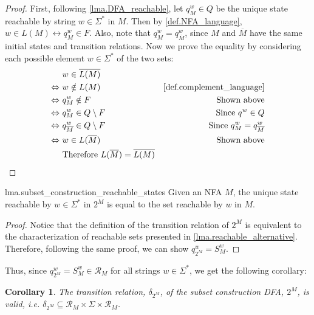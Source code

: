 \documentclass{report}
\newtheorem{corollary}[theorem]{Corollary}
\theoremstyle{definition}
\begin{document}
\begin{appendices}
\begin{proof}
First, following \cref{lma.DFA_reachable}, let $q^w_M \in Q$ be the unique state
reachable by string $w \in \Sigma^{\ast}$ in $M$. Then by
\cref{def.NFA_language}, $w \in L(M) \leftrightarrow q^w_M \in F$.
Also, note that $q^w_M = q^w_{\overline{M}}$, since $M$ and $\overline{M}$ have
the same initial states and transition relations.
Now we prove the equality by considering each possible element $w \in \Sigma^{\ast}$
of the two sets:
\begin{align*}
& w \in \overline{L(M)} \\
\Leftrightarrow \ & w \notin L(M)
& \text{\cref{def.complement_language}} \\
\Leftrightarrow \ & q^w_M \notin F
& \text{Shown above} \\
\Leftrightarrow \ & q^w_M \in Q \setminus F
& \text{Since } q^w \in Q \\
\Leftrightarrow \ & q^w_{\overline{M}} \in Q \setminus F
& \text{Since } q^w_M = q^w_{\overline{M}} \\
\Leftrightarrow \ & w \in L(\overline{M})
& \text{Shown above} \\
& \text{Therefore } L(\overline{M}) = \overline{L(M)}
\end{align*}
\end{proof}

\begin{replemma}{lma.subset_construction_reachable_states}
Given an NFA $M$, the unique state reachable by $w \in \Sigma^{\ast}$ in $2^M$
is equal to the set reachable by $w$ in $M$.
\end{replemma}

\begin{proof}
Notice that the definition of the transition relation of $2^M$ is equivalent to the
characterization of reachable sets presented in \cref{lma.reachable_alternative}.
Therefore, following the same proof, we can show $q^w_{2^M} = S^w_M$.
\end{proof}

Thus, since $q^w_{2^M} = S^w_M \in \mathcal{R}_M$ for all strings
$w \in \Sigma^{\ast}$, we get the following corollary:

\begin{corollary} \label{crl.subset_construction_transition_is_valid}
The transition relation, $\delta_{2^M}$, of the subset construction DFA, $2^M$, is
valid, i.e. $\delta_{2^M} \subseteq \mathcal{R}_M \times \Sigma \times \mathcal{R}_M$.
\end{corollary}


\end{appendices}
\end{document}
